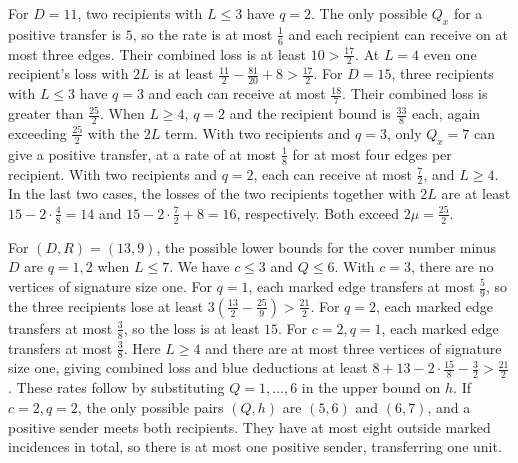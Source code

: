 \documentclass[preprint,11pt,numbers]{elsarticle-arxiv}
\numberwithin{equation}{section}
\theoremstyle{definition}
\begin{document}
For $D=11$, two recipients with $L\le3$ have $q=2$. The only
possible $Q_x$ for a positive transfer is $5$, so the rate
is at most $\frac{1}{6}$ and each recipient can receive on at most
three edges. Their combined loss is at least $10>\frac{17}{2}$.
At $L=4$ even one recipient's loss with $2L$ is at least
$\frac{11}{2}-\frac{81}{20}+8>\frac{17}{2}$. For $D=15$, three recipients with
$L\le3$ have $q=3$ and each can receive at most $\frac{18}{7}$.
Their combined loss is greater than $\frac{25}{2}$. When $L\ge4$,
$q=2$ and the recipient bound is $\frac{33}{8}$ each, again exceeding
$\frac{25}{2}$ with the $2L$ term. With two recipients and $q=3$,
only $Q_x=7$ can give a positive transfer, at a rate of at most
$\frac{1}{8}$ for at most four edges per recipient. With two recipients
and $q=2$, each can receive at most $\frac{7}{2}$, and $L\ge4$.
In the last two cases, the losses of the two recipients together
with $2L$ are at least $15-2\cdot\frac{4}{8}=14$ and
$15-2\cdot\frac{7}{2}+8=16$, respectively. Both exceed
$2\mu=\frac{25}{2}$.

For $(D,R)=(13,9)$, the possible lower bounds for the cover number
minus $D$ are $q=1,2$ when $L\le7$. We have $c\le3$ and $Q\le6$.
With $c=3$, there are no vertices of signature size one.
For $q=1$, each marked edge transfers at most $\frac{5}{9}$, so the
three recipients lose at least $3(\frac{13}{2}-\frac{25}{9})>\frac{21}{2}$.
For $q=2$, each marked edge transfers at most $\frac{3}{8}$, so the
loss is at least $15$. For $c=2,q=1$, each marked edge transfers at
most $\frac{3}{8}$. Here $L\ge4$ and there are at most three vertices
of signature size one, giving combined loss and blue deductions
at least $8+13-2\cdot\frac{15}{8}-\frac{3}{2}>\frac{21}{2}$.
These rates follow by substituting $Q=1,\ldots,6$ in the upper bound
on $h$. If $c=2,q=2$, the only possible pairs $(Q,h)$ are
$(5,6)$ and $(6,7)$, and a positive sender meets both recipients.
They have at most eight outside marked incidences in total, so
there is at most one positive sender, transferring one unit.
\end{document}
